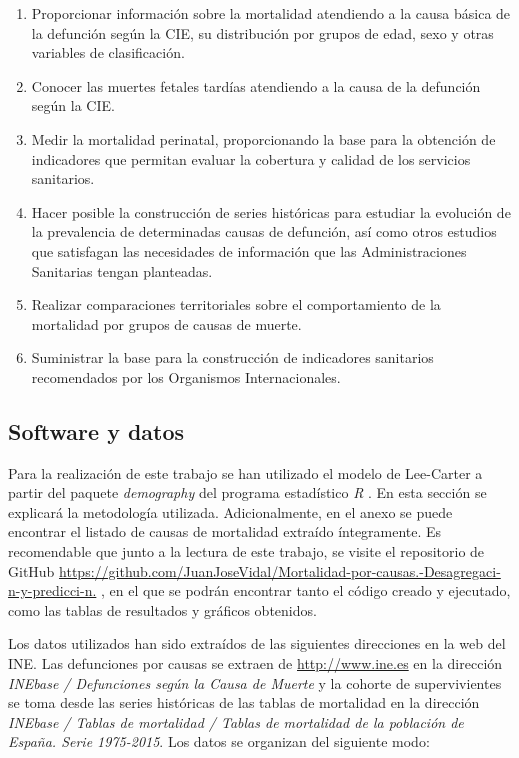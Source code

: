 \documentclass{article}
\begin{document}
\begin{enumerate}
\item Proporcionar información sobre la mortalidad atendiendo a la causa básica de la defunción según la CIE, su distribución por grupos de edad, sexo y otras variables de clasificación.
\item Conocer las muertes fetales tardías atendiendo a la causa de la defunción según la CIE.
\item Medir la mortalidad perinatal, proporcionando la base para la obtención de indicadores que permitan evaluar la cobertura y calidad de los servicios sanitarios.
\item Hacer posible la construcción de series históricas para estudiar la evolución de la prevalencia de determinadas causas de defunción, así como otros estudios que satisfagan las necesidades de información que las Administraciones Sanitarias tengan planteadas.
\item Realizar comparaciones territoriales sobre el comportamiento de la mortalidad por grupos de causas de muerte.
\item Suministrar la base para la construcción de indicadores sanitarios recomendados por los Organismos Internacionales.
\end{enumerate}


\subsection{Software y datos}

Para la realización de este trabajo se han utilizado el modelo de Lee-Carter a partir del paquete \emph{demography} \cite{demography} del programa estadístico \emph{R} \cite{rlang}. En esta sección se explicará la metodología utilizada. Adicionalmente, en el anexo se puede encontrar el listado de causas de mortalidad extraído íntegramente.
Es recomendable que junto a la lectura de este trabajo, se visite el repositorio de GitHub \url{https://github.com/JuanJoseVidal/Mortalidad-por-causas.-Desagregaci-n-y-predicci-n.} , en el que se podrán encontrar tanto el código creado y ejecutado, como las tablas de resultados y gráficos obtenidos.


Los datos utilizados han sido extraídos de las siguientes direcciones en la web del INE. Las defunciones por causas se extraen de \url{http://www.ine.es} en la dirección \emph{INEbase / Defunciones según la Causa de Muerte} y la cohorte de supervivientes se toma desde las series históricas de las tablas de mortalidad en la dirección \emph{INEbase / Tablas de mortalidad / Tablas de mortalidad de la población de España. Serie 1975-2015}. Los datos se organizan del siguiente modo:
\end{document}
